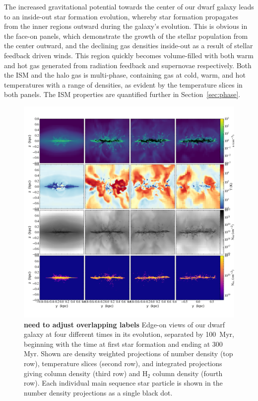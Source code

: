 \documentclass[twocolumn]{aastex61}
\begin{document}
The increased gravitational potential towards the center of our dwarf galaxy leads to an inside-out star formation evolution, whereby star formation propagates from the inner regions outward during the galaxy's evolution. This is obvious in the face-on panels, which demonstrate the growth of the stellar population from the center outward, and the declining gas densities inside-out as a result of stellar feedback driven winds. This region quickly becomes volume-filled with both warm and hot gas generated from radiation feedback and supernovae respectively. Both the ISM and the halo gas is multi-phase, containing gas at cold, warm, and hot temperatures with a range of densities, as evident by the temperature slices in both panels. The ISM properties are quantified further in Section~\ref{sec:phase}.

\begin{figure}
\centering
\includegraphics[width=0.975\linewidth]{multiplot_4x4_x.png}
\caption{ \textbf{need to adjust overlapping labels} Edge-on views of our dwarf galaxy at four different times in its evolution, separated by 100~Myr, beginning with the time at first star formation and ending at 300 Myr. Shown are density weighted projections of number density (top row), temperature slices (second row), and integrated projections giving  column density (third row) and H$_2$ column density (fourth row). Each individual main sequence star particle is shown in the number density projections as a single black dot.}
\label{fig:panel_x}
\end{figure}
\end{document}
